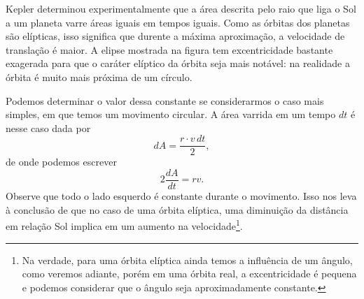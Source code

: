 \begin{marginfigure}
\centering
{}
\caption{Kepler determinou experimentalmente que a área descrita pelo raio que liga o Sol a um planeta varre áreas iguais em tempos iguais. Como as órbitas dos planetas são elípticas, isso significa que durente a máxima aproximação, a velocidade de translação é maior. A elipse mostrada na figura tem excentricidade bastante exagerada para que o caráter elíptico da órbita seja mais notável: na realidade a órbita é muito mais próxima de um círculo.}
\end{marginfigure}

Podemos determinar o valor dessa constante se considerarmos o caso mais simples, em que temos um movimento circular. A área varrida em um tempo $dt$ é nesse caso dada por
\begin{equation}
    dA = \frac{r \cdot v \, dt}{2},
\end{equation}
%
de onde podemos escrever
\begin{equation}\label{Eq:VelAreaLeiKepler}
    2\frac{dA}{dt} = r v.
\end{equation}
%
Observe que todo o lado esquerdo é constante durante o movimento. Isso nos leva à conclusão de que no caso de uma órbita elíptica, uma diminuição da distância em relação Sol implica em um aumento na velocidade\footnote{Na verdade, para uma órbita elíptica ainda temos a influência de um ângulo, como veremos adiante, porém em uma órbita real, a excentricidade é pequena e podemos considerar que o ângulo seja aproximadamente constante.}.

